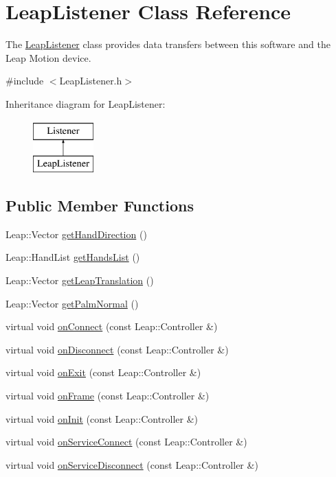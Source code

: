 \hypertarget{classLeapListener}{}\section{Leap\+Listener Class Reference}
\label{classLeapListener}


The \hyperlink{classLeapListener}{Leap\+Listener} class provides data transfers between this software and the Leap Motion device.  




{\ttfamily \#include $<$Leap\+Listener.\+h$>$}

Inheritance diagram for Leap\+Listener\+:\begin{figure}[H]
\begin{center}
\leavevmode
\includegraphics[height=2.000000cm]{classLeapListener}
\end{center}
\end{figure}
\subsection*{Public Member Functions}
\begin{DoxyCompactItemize}
\item 
Leap\+::\+Vector \hyperlink{classLeapListener_ac33a478bf23609d90da987045e6c09a6}{get\+Hand\+Direction} ()
\item 
Leap\+::\+Hand\+List \hyperlink{classLeapListener_a2926ac8cb2f4c2dc609224b72027d943}{get\+Hands\+List} ()
\item 
Leap\+::\+Vector \hyperlink{classLeapListener_ab7984ae05e41da2d31094488fc48d9cc}{get\+Leap\+Translation} ()
\item 
Leap\+::\+Vector \hyperlink{classLeapListener_ab247950ad2d43f8a86e8e1268b944391}{get\+Palm\+Normal} ()
\item 
virtual void \hyperlink{classLeapListener_a7d3131cb9c68b08adbecfa0991ef92f3}{on\+Connect} (const Leap\+::\+Controller \&)
\item 
virtual void \hyperlink{classLeapListener_a5b642ad6f373498b8cec2967d0931391}{on\+Disconnect} (const Leap\+::\+Controller \&)
\item 
virtual void \hyperlink{classLeapListener_a81f0ecbd8f407095abf359c30e8fa19e}{on\+Exit} (const Leap\+::\+Controller \&)
\item 
virtual void \hyperlink{classLeapListener_a63c3c85769306c066207fd00c7dbcf45}{on\+Frame} (const Leap\+::\+Controller \&)
\item 
virtual void \hyperlink{classLeapListener_a4eb09ec0bd5faf4ffd496d360aa7f1a4}{on\+Init} (const Leap\+::\+Controller \&)
\item 
virtual void \hyperlink{classLeapListener_ae4f8be9b6955e1f4ac4710f28dd70bd7}{on\+Service\+Connect} (const Leap\+::\+Controller \&)
\item 
virtual void \hyperlink{classLeapListener_ae63c5043bda6a559fe045c23fad2d58d}{on\+Service\+Disconnect} (const Leap\+::\+Controller \&)
\end{DoxyCompactItemize}
